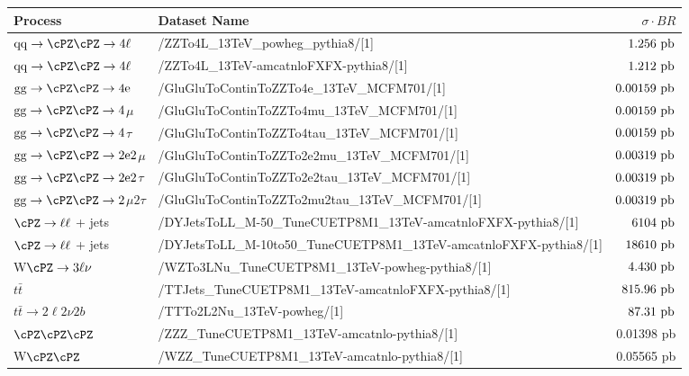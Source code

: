 \begin{table}
\begin{footnotesize}
    \centering
    \begin{tabular}{|l|l|r|}
   \hline
 Process & Dataset Name & $\sigma\cdot BR$ \\ \hline
 $\rm{qq} \to \cPZ\cPZ \to 4\ell$ & /ZZTo4L\_13TeV\_powheg\_pythia8/[1] & $1.256~\rm{pb}$ \\
 $\rm{qq} \to \cPZ\cPZ \to 4\ell$ & /ZZTo4L\_13TeV-amcatnloFXFX-pythia8/[1] & $1.212~\rm{pb}$ \\
 $\rm{gg} \rightarrow \cPZ\cPZ \to 4e$ & /GluGluToContinToZZTo4e\_13TeV\_MCFM701/[1] & $0.00159~\rm{ pb}$ \\
 $\rm{gg} \rightarrow \cPZ\cPZ \to 4$$\mu$ & /GluGluToContinToZZTo4mu\_13TeV\_MCFM701/[1] & $0.00159~\rm{ pb}$ \\
 $\rm{gg} \rightarrow \cPZ\cPZ \to 4$$\tau$ & /GluGluToContinToZZTo4tau\_13TeV\_MCFM701/[1] & $0.00159~\rm{ pb}$ \\
 $\rm{gg} \rightarrow \cPZ\cPZ \to 2e2$$\mu$ & /GluGluToContinToZZTo2e2mu\_13TeV\_MCFM701/[1] & $0.00319~\rm{ pb}$ \\
 $\rm{gg} \rightarrow \cPZ\cPZ \to 2e2$$\tau$ & /GluGluToContinToZZTo2e2tau\_13TeV\_MCFM701/[1] & $0.00319~\rm{ pb}$ \\
 $\rm{gg} \rightarrow \cPZ\cPZ \to 2$$\mu2$$\tau$ & /GluGluToContinToZZTo2mu2tau\_13TeV\_MCFM701/[1] & $0.00319~\rm{ pb}$ \\ \hline
 $\cPZ \to \ell\ell$ + jets & /DYJetsToLL\_M-50\_TuneCUETP8M1\_13TeV-amcatnloFXFX-pythia8/[1] & $6104~\rm{ pb}$ \\
 $\cPZ \to \ell\ell$ + jets  & /DYJetsToLL\_M-10to50\_TuneCUETP8M1\_13TeV-amcatnloFXFX-pythia8/[1] & $18610~\rm{ pb}$ \\ \hline
 W$\cPZ \to 3\ell\nu$ & /WZTo3LNu\_TuneCUETP8M1\_13TeV-powheg-pythia8/[1] & $4.430~\rm{ pb}$ \\ \hline
 $t\bar{t}$ & /TTJets\_TuneCUETP8M1\_13TeV-amcatnloFXFX-pythia8/[1] & $815.96~\rm{ pb}$ \\ 
 $t\bar{t} \to 2\ell2\nu 2b$ & /TTTo2L2Nu\_13TeV-powheg/[1] &  $87.31~\rm{pb}$ \\ 
\hline
$\cPZ\cPZ\cPZ$ & /ZZZ\_TuneCUETP8M1\_13TeV-amcatnlo-pythia8/[1] & 0.01398 pb \\
W$\cPZ\cPZ$ &  /WZZ\_TuneCUETP8M1\_13TeV-amcatnlo-pythia8/[1] & 0.05565 pb \\

\end{tabular}
\end{footnotesize}
\end{table}
